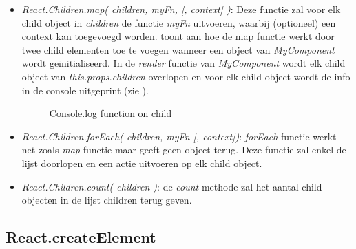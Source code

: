 		\begin{itemize}
			\item \emph{React.Children.map( children, myFn, [, context] )}: Deze functie zal voor elk child object in \emph{children} de functie \emph{myFn} uitvoeren, waarbij (optioneel) een context kan toegevoegd worden.
			 toont aan hoe de map functie werkt door twee child elementen toe te voegen wanneer een object van \emph{MyComponent} wordt geïnitialiseerd. In de \emph{render} functie van \emph{MyComponent} wordt elk child object van \emph{this.props.children} overlopen en voor elk child object wordt de info in de console uitgeprint (zie ).
			\begin{figure}%
				\centering
				\caption{Console.log function on child}%
				\label{fig:mapconsole}%
			\end{figure}
			\item \emph{React.Children.forEach( children, myFn [, context])}: \emph{forEach} functie werkt net zoals \emph{map} functie maar geeft geen object terug. Deze functie zal enkel de lijst doorlopen en een actie uitvoeren op elk child object.
			\item \emph{React.Children.count( children )}: de \emph{count} methode zal het aantal child objecten in de lijst children terug geven.
		\end{itemize}
	
	\subsection{React.createElement}
		
